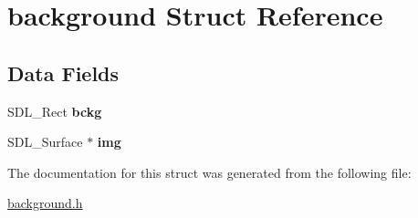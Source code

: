 \hypertarget{structbackground}{}\section{background Struct Reference}
\label{structbackground}
\subsection*{Data Fields}
\begin{DoxyCompactItemize}
\item 
S\+D\+L\+\_\+\+Rect {\bfseries bckg}\hypertarget{structbackground_a6cd0518c8d8a98207f008f55de18de1d}{}\label{structbackground_a6cd0518c8d8a98207f008f55de18de1d}

\item 
S\+D\+L\+\_\+\+Surface $\ast$ {\bfseries img}\hypertarget{structbackground_a1c5c3a3ebb56924b9f829602f9641006}{}\label{structbackground_a1c5c3a3ebb56924b9f829602f9641006}

\end{DoxyCompactItemize}


The documentation for this struct was generated from the following file\+:\begin{DoxyCompactItemize}
\item 
\hyperlink{background_8h}{background.\+h}\end{DoxyCompactItemize}
